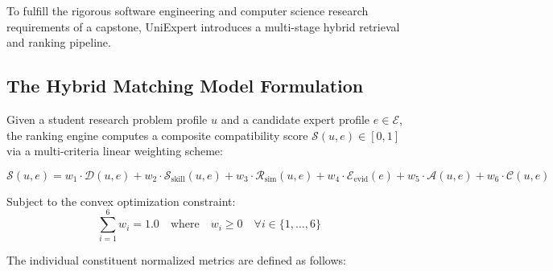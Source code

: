 \documentclass[11pt,a4paper]{article}
\begin{document}
To fulfill the rigorous software engineering and computer science research requirements of a capstone, UniExpert introduces a multi-stage hybrid retrieval and ranking pipeline.

\subsection{The Hybrid Matching Model Formulation}
Given a student research problem profile $u$ and a candidate expert profile $e \in \mathcal{E}$, the ranking engine computes a composite compatibility score $\mathcal{S}(u, e) \in [0, 1]$ via a multi-criteria linear weighting scheme:

\begin{equation}
    \mathcal{S}(u, e) = w_1 \cdot \mathcal{D}(u, e) + w_2 \cdot \mathcal{S}_{\text{skill}}(u, e) + w_3 \cdot \mathcal{R}_{\text{sim}}(u, e) + w_4 \cdot \mathcal{E}_{\text{evid}}(e) + w_5 \cdot \mathcal{A}(u, e) + w_6 \cdot \mathcal{C}(u, e)
    \label{eq:hybrid_formula}
\end{equation}

Subject to the convex optimization constraint:
\begin{equation}
    \sum_{i=1}^{6} w_i = 1.0 \quad \text{where} \quad w_i \ge 0 \quad \forall i \in \{1, \dots, 6\}
\end{equation}

The individual constituent normalized metrics are defined as follows:
\end{document}
